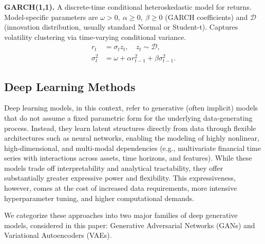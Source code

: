 \documentclass[sigconf]{acmart}
\begin{document}
\begin{enumerate}[label=\textbf{[A\arabic*]}]
        \item \label{alg:garch} \textbf{GARCH(1,1).} 
        A discrete-time conditional heteroskedastic model for 
        returns. Model-specific parameters are \(\omega>0,\ 
        \alpha\ge0,\ \beta\ge0\) (GARCH coefficients) and 
        \(\mathcal D\) (innovation distribution, usually standard 
        Normal or Student-t). Captures volatility clustering via 
        time-varying conditional variance.
        \begin{align}
          r_t &= \sigma_t z_t,\quad z_t\sim\mathcal D,\\
          \sigma_t^2 &= \omega + \alpha r_{t-1}^2 + \beta \sigma_{t-1}^2. \nonumber
        \end{align}
      \end{enumerate}


  \subsection{Deep Learning Methods}\label{sub:deep-learning-methods}
    Deep learning models, in this context, refer to generative 
    (often implicit) models that do not assume a fixed parametric 
    form for the underlying data-generating process. Instead, they 
    learn latent structures directly from data through flexible 
    architectures such as neural networks, enabling the modeling 
    of highly nonlinear, high-dimensional, and multi-modal 
    dependencies (e.g., multivariate financial time series with 
    interactions across assets, time horizons, and features). 
    While these models trade off interpretability and analytical 
    tractability, they offer substantially greater expressive 
    power and flexibility. This expressiveness, however, comes at 
    the cost of increased data requirements, more intensive 
    hyperparameter tuning, and higher computational demands. 

    We categorize these approaches into two major families of
    deep generative models, considered in this paper: 
    Generative Adversarial Networks (GANs)
    and Variational Autoencoders (VAEs).
    
\end{document}

